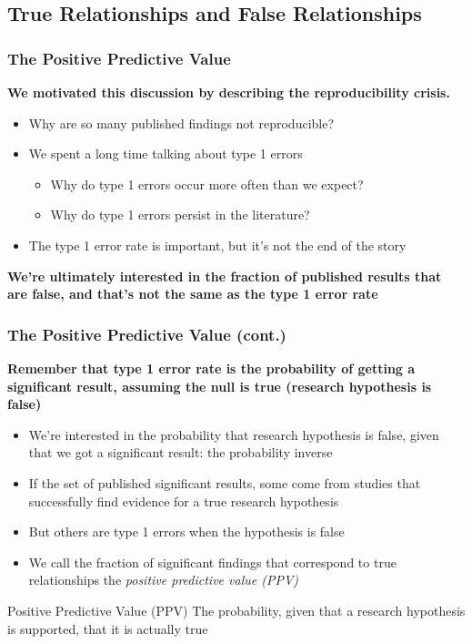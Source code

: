 \documentclass[10pt, block=fill]{beamer}
\begin{document}
\subsection{True Relationships and False Relationships}

\begin{frame}
    \frametitle{The Positive Predictive Value}
    
    \textbf{We motivated this discussion by describing the reproducibility crisis.} 
    
    \begin{itemize}
        \item Why are so many published findings not reproducible?
        \item We spent a long time talking about type 1 errors
        \begin{itemize}
            \item Why do type 1 errors occur more often than we expect?
            \item Why do type 1 errors persist in the literature?
        \end{itemize}
        \item The type 1 error rate is important, but it's not the end of the story
    \end{itemize}
    
    \textbf{We're ultimately interested in the fraction of published results that are false, and that's not the same as the type 1 error rate}
\end{frame}

\begin{frame}
    \frametitle{The Positive Predictive Value (cont.)}
    
    \textbf{Remember that type 1 error rate is the probability of getting a significant result, assuming the null is true (research hypothesis is false)}
    \begin{itemize}
        \item We're interested in the probability that research hypothesis is false, given that we got a significant result: the probability inverse
        \item If the set of published significant results, some come from studies that successfully find evidence for a true research hypothesis
        \item But others are type 1 errors when the hypothesis is false
        \item We call the fraction of significant findings that correspond to true relationships the \textit{positive predictive value (PPV)}
    \end{itemize}
    
    \begin{block}{Positive Predictive Value (PPV)}
        The probability, given that a research hypothesis is supported, that it is actually true
    \end{block}
\end{frame}
\end{document}
